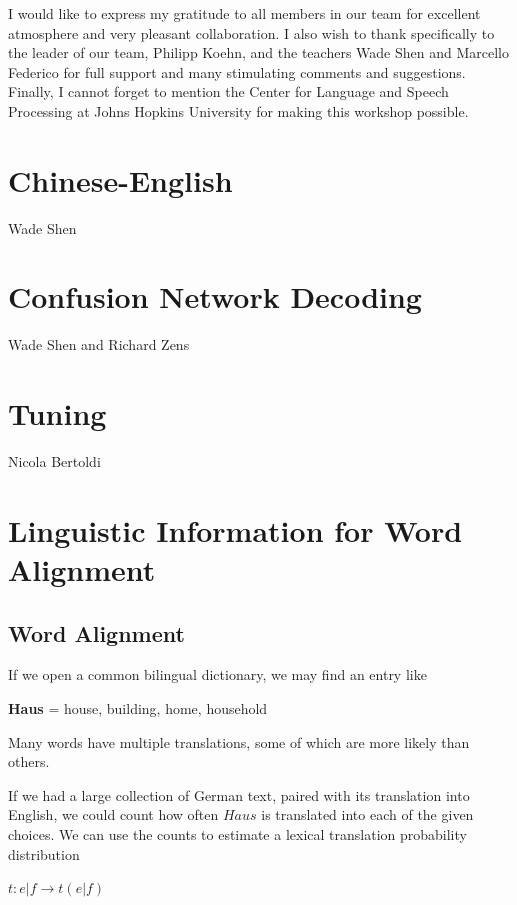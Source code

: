 \documentclass[11pt]{book}
\theoremstyle{plain}
\begin{document}
I would like to express my gratitude to all members in our team for excellent
atmosphere and very pleasant collaboration. I also wish to thank specifically to
the leader of our team, Philipp Koehn, and the teachers Wade Shen and Marcello
Federico for full support and many stimulating comments and suggestions.
Finally, I cannot forget to mention the Center for Language and Speech Processing at Johns Hopkins
University for making this workshop possible.


\section{Chinese-English}
{\sc Wade Shen}

\section{Confusion Network Decoding}
{\sc Wade Shen and Richard Zens}

\section{Tuning}
{\sc Nicola Bertoldi}

\section{Linguistic Information for Word Alignment}

\subsection{Word Alignment\\}

If we open a common bilingual dictionary, we may find an entry
like\\
\begin{center}
\textbf{Haus} = house, building, home, household\\
\end{center}
Many words have multiple translations, some of which are more likely
than others.

If we had a large collection of German text, paired with its
translation into English, we could count how often $Haus$ is
translated into each of the given choices. We can use the counts to
estimate a lexical translation probability distribution

\begin{center}
$t : e|f \rightarrow t(e|f)$
\end{center}
\end{document}
